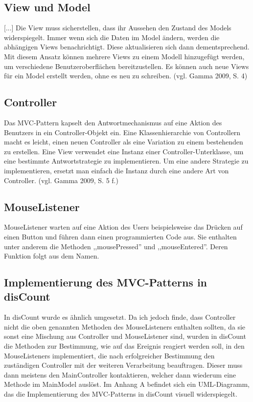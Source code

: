 \documentclass[12pt]{report}
\begin{document}
\subsection{View und Model}
[...] Die View muss sicherstellen, dass ihr Aussehen den Zustand des Models widerspiegelt. Immer wenn sich die Daten im Model ändern, werden die abhängigen Views benachrichtigt. Diese aktualisieren sich dann dementsprechend. Mit diesem Ansatz können mehrere Views zu einem Modell hinzugefügt werden, um verschiedene Benutzeroberflächen bereitzustellen. Es können auch neue Views für ein Model erstellt werden, ohne es neu zu schreiben. (vgl. Gamma 2009,  S. 4\nocite{DPGOF})\\

\subsection{Controller}
Das MVC-Pattern kapselt den Antwortmechanismus auf eine Aktion des Benutzers in ein Controller-Objekt ein. Eine Klassenhierarchie von Controllern macht es leicht, einen neuen Controller als eine Variation zu einem bestehenden zu erstellen.
\noindent Eine View verwendet eine Instanz einer Controller-Unterklasse, um eine bestimmte Antwortstrategie zu implementieren. Um eine andere Strategie zu implementieren, ersetzt man einfach die Instanz durch eine andere Art von Controller. (vgl. Gamma 2009, S. 5 f.\nocite{DPGOF})\\

\subsection{MouseListener}
MouseListener warten auf eine Aktion des Users beispielsweise das Drücken auf einen Button und führen dann einen programmierten Code aus. Sie enthalten unter anderem die Methoden ,,mousePressed'' und ,,mouseEntered''. Deren Funktion folgt aus dem Namen.

\subsection{Implementierung des MVC-Patterns in disCount}
In disCount wurde es ähnlich umgesetzt. Da ich jedoch finde, dass Controller nicht die oben genannten Methoden des MouseListeners enthalten sollten, da sie sonst eine Mischung aus Controller und MouseListener sind, wurden in disCount die Methoden zur Bestimmung, wie auf das Ereignis reagiert werden soll, in den MouseListeners implementiert, die nach erfolgreicher Bestimmung den zuständigen Controller mit der weiteren Verarbeitung beauftragen. Dieser muss dann meistens den MainController kontaktieren, welcher dann wiederum eine Methode im MainModel auslöst. Im Anhang A befindet sich ein UML-Diagramm, das die Implementierung des MVC-Patterns in disCount visuell widerspiegelt.
\end{document}

